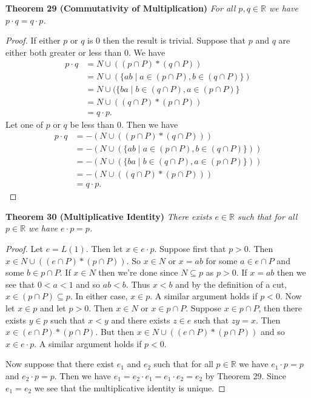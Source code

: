 \documentclass{article}
\begin{document}
\begin{flushleft}
\textbf{Theorem 29 (Commutativity of Multiplication)}
\textsl{For all $p,q \in \mathbb{R}$ we have $p \cdot q = q \cdot p$.}
\begin{proof}
If either $p$ or $q$ is $0$ then the result is trivial. Suppose that $p$ and $q$ are either both greater or less than $0$. We have
\begin{align*}
p \cdot q &= N \cup ((p \cap P) * (q \cap P)) \\
		&= N \cup (\{ab \mid a \in (p \cap P), b \in (q \cap P)\}) \\
		&= N \cup (\{ba \mid b \in (q \cap P), a \in (p \cap P)\} \\
		&= N \cup ((q \cap P) * (p \cap P)) \\
		&= q \cdot p.
\end{align*}
Let one of $p$ or $q$ be less than $0$. Then we have
\begin{align*}
p \cdot q &= -(N \cup ((p \cap P) * (q \cap P))) \\
		&= -(N \cup (\{ab \mid a \in (p \cap P), b \in (q \cap P)\})) \\
		&= -(N \cup (\{ba \mid b \in (q \cap P), a \in (p \cap P)\})) \\
		&= -(N \cup ((q \cap P) * (p \cap P))) \\
		&= q \cdot p.
\end{align*}
\end{proof}

\textbf{Theorem 30 (Multiplicative Identity)}
\textsl{There exists $e \in \mathbb{R}$ such that for all $p \in \mathbb{R}$ we have $e \cdot p = p$.}
\begin{proof}
Let $e=L(1)$. Then let $x \in e \cdot p$. Suppose first that $p>0$. Then $x \in N \cup ((e \cap P) * (p \cap P))$. So $x \in N$ or $x = ab$ for some $a \in e \cap P$ and some $b \in p \cap P$. If $x \in N$ then we're done since $N \subseteq p$ as $p>0$. If $x=ab$ then we see that $0<a<1$ and so $ab<b$. Thus $x<b$ and by the definition of a cut, $x \in (p \cap P) \subseteq p$. In either case, $x \in p$. A similar argument holds if $p<0$. Now let $x \in p$ and let $p>0$. Then $x \in N$ or $x \in p \cap P$. Suppose $x \in p \cap P$, then there exists $y \in p$ such that $x < y$ and there exists $z \in e$ such that $zy = x$. Then $x \in (e \cap P) * (p \cap P)$. But then $x \in N \cup ((e \cap P) * (p \cap P))$ and so $x \in e \cdot p$. A similar argument holds if $p<0$.\newline

Now suppose that there exist $e_1$ and $e_2$ such that for all $p \in \mathbb{R}$ we have $e_1 \cdot p=p$ and $e_2 \cdot p=p$. Then we have $e_1=e_2 \cdot e_1=e_1 \cdot e_2=e_2$ by Theorem 29. Since $e_1=e_2$ we see that the multiplicative identity is unique.
\end{proof}


\end{flushleft}
\end{document}

